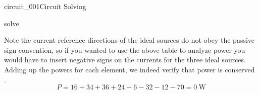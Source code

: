 \begin{mainquestion}{circuit_001}{Circuit Solving}
\begin{partquestion}{solve}
\begin{answer}
\begin{table}[htbp]
\end{table}

Note the current reference directions of the ideal sources do not obey the passive sign convention, so if you wanted to use the above table to analyze power you would have to insert negative signs on the currents for the three ideal sources. Adding up the powers for each element, we indeed verify that power is conserved
.
\[
P = 16 + 34 + 36 + 24 + 6 -32 - 12 - 70 = \qty{0}{\watt}
\]

\end{answer}
\end{partquestion}

\end{mainquestion}